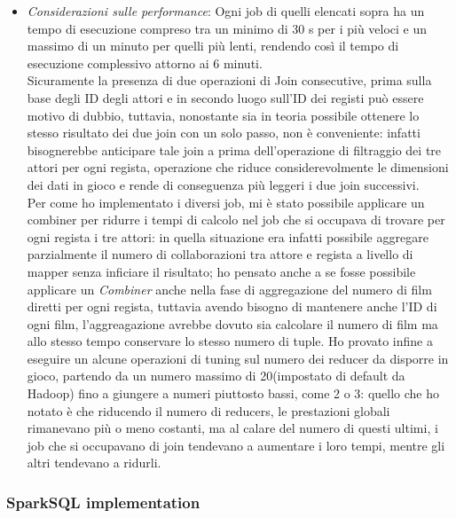 \documentclass[hidelinks]{article}
\begin{document}
\begin{itemize}
\begin{itemize}
		
	\end{itemize}
	\item \textit{Considerazioni sulle performance}: Ogni job di quelli elencati sopra ha un tempo di esecuzione compreso tra un minimo di 30 s per i più veloci e un massimo di un minuto per quelli più lenti, rendendo così il tempo di esecuzione complessivo attorno ai 6 minuti.\\
	Sicuramente la presenza di due operazioni di Join consecutive, prima sulla base degli ID degli attori e in secondo luogo sull'ID dei registi può essere motivo di dubbio, tuttavia, nonostante sia in teoria possibile ottenere lo stesso risultato dei due join con un solo passo, non è conveniente: infatti bisognerebbe anticipare tale join a prima dell'operazione di filtraggio dei tre attori per ogni regista, operazione che riduce considerevolmente le dimensioni dei dati in gioco e rende di conseguenza più leggeri i due join successivi.\\
	Per come ho implementato i diversi job, mi è stato possibile applicare un combiner per ridurre i tempi di calcolo nel job che si occupava di trovare per ogni regista i tre attori: in quella situazione era infatti possibile aggregare parzialmente il numero di collaborazioni tra attore e regista a livello di mapper senza inficiare il risultato; ho pensato anche a se fosse possibile applicare un \textit{Combiner} anche nella fase di aggregazione del numero di film diretti per ogni regista, tuttavia avendo bisogno di mantenere anche l'ID di ogni film, l'aggreagazione avrebbe dovuto sia calcolare il numero di film ma allo stesso tempo conservare lo stesso numero di tuple.
	Ho provato infine a eseguire un alcune operazioni di tuning sul numero dei reducer da disporre in gioco, partendo da un numero massimo di 20(impostato di default da Hadoop) fino a giungere a numeri piuttosto bassi, come 2 o 3: quello che ho notato è che riducendo il numero di reducers, le prestazioni globali rimanevano più o meno costanti, ma al calare del numero di questi ultimi, i job che si occupavano di join tendevano a aumentare i loro tempi, mentre gli altri tendevano a ridurli. 
\end{itemize}

\subsubsection{SparkSQL implementation}
\end{document}
